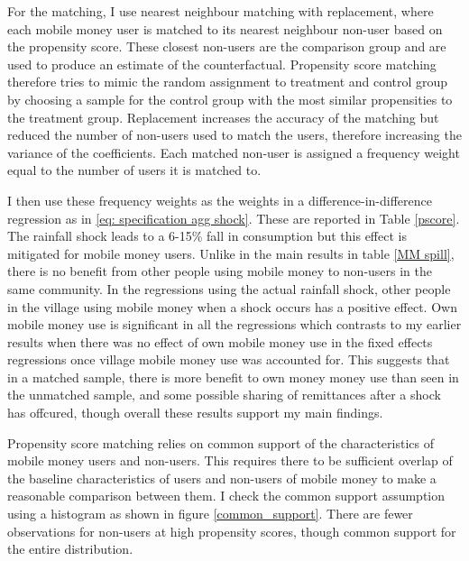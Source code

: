 For the matching, I use nearest neighbour matching with replacement, where each mobile money user is matched to its nearest neighbour non-user based on the propensity score. These closest non-users are the comparison group and are used to produce an estimate of the counterfactual. Propensity score matching therefore tries to mimic the random assignment to treatment and control group by choosing a sample for the control group with the most similar propensities to the treatment group. Replacement increases the accuracy of the matching but reduced the number of non-users used to match the users, therefore increasing the variance of the coefficients. Each matched non-user is assigned a frequency weight equal to the number of users it is matched to.

I then use these frequency weights as the weights in a difference-in-difference regression as in \eqref{eq: specification agg shock}. These are reported in Table \ref{pscore}. The rainfall shock leads to a 6-15\% fall in consumption but this effect is mitigated for mobile money users. Unlike in the main results in table \ref{MM spill}, there is no benefit from other people using mobile money to non-users in the same community. In the regressions using the actual rainfall shock, other people in the village  using mobile money when a shock occurs has a positive effect. Own mobile money use is significant in all the regressions which contrasts to my earlier results when there was no effect of own mobile money use in the fixed effects regressions once village mobile money use was accounted for. This suggests that in a matched sample, there is more benefit to own money money use than seen in the unmatched sample, and some possible sharing of remittances after a shock has offcured, though overall these results support my main findings. 

  

 Propensity score matching relies on common support of the characteristics of mobile money users and non-users. This requires there to be sufficient overlap of the baseline characteristics of users and non-users of mobile money to make a reasonable comparison between them. I check the common support assumption using a histogram as shown in figure \ref{common_support}. There are fewer observations for non-users at high propensity scores, though common support for the entire distribution.  

